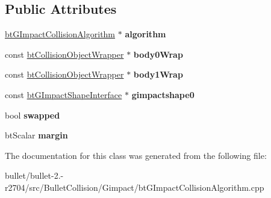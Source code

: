 \subsection*{Public Attributes}
\begin{DoxyCompactItemize}
\item 
\hypertarget{classbt_g_impact_triangle_callback_a3510328454e139e9f31b5da698464307}{\hyperlink{classbt_g_impact_collision_algorithm}{bt\+G\+Impact\+Collision\+Algorithm} $\ast$ {\bfseries algorithm}}\label{classbt_g_impact_triangle_callback_a3510328454e139e9f31b5da698464307}

\item 
\hypertarget{classbt_g_impact_triangle_callback_abb33f5635be7618e8df24fbeb04eb3db}{const \hyperlink{structbt_collision_object_wrapper}{bt\+Collision\+Object\+Wrapper} $\ast$ {\bfseries body0\+Wrap}}\label{classbt_g_impact_triangle_callback_abb33f5635be7618e8df24fbeb04eb3db}

\item 
\hypertarget{classbt_g_impact_triangle_callback_a244f582f9ade39bb7709b5d4472cb560}{const \hyperlink{structbt_collision_object_wrapper}{bt\+Collision\+Object\+Wrapper} $\ast$ {\bfseries body1\+Wrap}}\label{classbt_g_impact_triangle_callback_a244f582f9ade39bb7709b5d4472cb560}

\item 
\hypertarget{classbt_g_impact_triangle_callback_a875310649da0b01efb1ce1474abaed44}{const \hyperlink{classbt_g_impact_shape_interface}{bt\+G\+Impact\+Shape\+Interface} $\ast$ {\bfseries gimpactshape0}}\label{classbt_g_impact_triangle_callback_a875310649da0b01efb1ce1474abaed44}

\item 
\hypertarget{classbt_g_impact_triangle_callback_a9c586a375d8f5d2def030e8890aba1db}{bool {\bfseries swapped}}\label{classbt_g_impact_triangle_callback_a9c586a375d8f5d2def030e8890aba1db}

\item 
\hypertarget{classbt_g_impact_triangle_callback_a55bde3e2ba0cd5f24785c70bcc72b5a2}{bt\+Scalar {\bfseries margin}}\label{classbt_g_impact_triangle_callback_a55bde3e2ba0cd5f24785c70bcc72b5a2}

\end{DoxyCompactItemize}


The documentation for this class was generated from the following file\+:\begin{DoxyCompactItemize}
\item 
bullet/bullet-\/2.-\/r2704/src/\+Bullet\+Collision/\+Gimpact/bt\+G\+Impact\+Collision\+Algorithm.\+cpp\end{DoxyCompactItemize}
